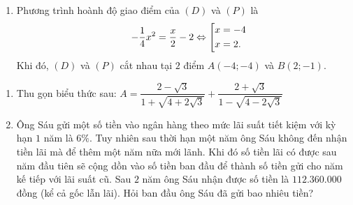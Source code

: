 \begin{ex}
{\begin{enumerate}
	
	\item 
	Phương trình hoành độ giao điểm của $(D)$ và $(P)$ là
	\begin{eqnarray*}
&&	-\dfrac{1}{4}x^2=\dfrac{x}{2}-2\Leftrightarrow \left[\begin{aligned}&x=-4\\&x=2.\end{aligned}\right.
	\end{eqnarray*}
Khi đó, $(D)$ và $(P)$ cắt nhau tại $2$ điểm $A(-4;-4)$ và $B(2;-1)$.
\end{enumerate}
}
\end{ex}

\begin{ex}%
\begin{enumerate}
\item Thu gọn biểu thức sau: $A=\dfrac{2-\sqrt{3}}{1+\sqrt{4+2\sqrt{3}}}+ \dfrac{2+\sqrt{3}}{1-\sqrt{4-2\sqrt{3}}}$
\item Ông Sáu gửi một số tiền vào ngân hàng theo mức lãi suất tiết kiệm với kỳ hạn $ 1 $ năm là $ 6\% $. Tuy nhiên sau thời hạn một năm ông Sáu không đến nhận tiền lãi mà để thêm một năm nữa mới lãnh. Khi đó số tiền lãi có được sau năm đầu tiên sẽ cộng dồn vào số tiền ban đầu để thành số tiền gửi cho năm kế tiếp với lãi suất cũ. Sau $ 2 $ năm ông Sáu nhận được số tiền là $ 112.360.000 $ đồng (kể cả gốc lẫn lãi). Hỏi ban đầu ông Sáu đã gửi bao nhiêu tiền?
\end{enumerate}
\end{ex}

